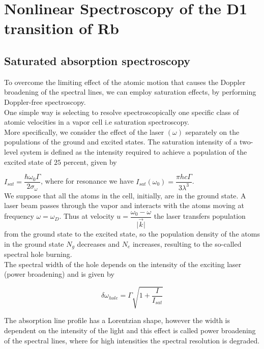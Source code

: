 \documentclass[openany,11pt,a4paper]{book}
\begin{document}
\chapter{Nonlinear Spectroscopy  of  the D1 transition of Rb}
 

 
 
\section{Saturated absorption spectroscopy}

To overcome the limiting effect of the atomic motion that causes the Doppler broadening of the spectral lines, we can employ saturation effects, by performing Doppler-free spectroscopy.\\
One simple way is selecting to resolve spectroscopically one specific class of atomic velocities in a vapor cell i.e saturation spectroscopy.\\

More specifically, we consider the effect of the laser $(\omega)$ separately on the populations of the ground and excited states.
The saturation intensity of a two-level system is defined as the intensity required to achieve a population of the excited state of $25$ percent, given by 

$ I_{sat}= \dfrac{\hbar \omega_{0} \Gamma}{2 \sigma_{\omega}}$, where for resonance we have 
$I_{sat}(\omega_{0})= \dfrac{\pi hc\Gamma}{3\lambda^{3}}$.\\


We suppose that all the atoms in the cell, initially, are in the ground state. A laser beam passes through the vapor and interacts with the atoms moving at frequency $\omega= \omega_{D}$. Thus at velocity $u=\dfrac{\omega_{0}-\omega}{\vert \vec{k}\vert}$ the laser transfers population from the ground state to the excited state, so the population density of the atoms in the ground state $N_{g}$ decreases and $N_{e}$ increases, resulting to the so-called spectral hole burning.\\


The spectral width of the hole depends on the intensity of the exciting laser (power broadening) and is given by  

\begin{equation}
\delta \omega _{hole }= \Gamma \sqrt{1+ \dfrac{I}{I_{sat}}}
\end{equation}

The absorption line profile has a Lorentzian shape, however the width is dependent on the intensity of the light and this effect is called power broadening of the spectral lines, where for high intensities the spectral resolution is degraded.\\
\end{document}
